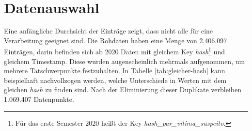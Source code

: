 \documentclass[12pt]{report}
\begin{document}
	\section{Datenauswahl}
	Eine anfängliche Durchsicht der Einträge zeigt, dass nicht alle für eine Verarbeitung geeignet sind. Die Rohdaten haben eine Menge von 2.406.097 Einträgen, darin befinden sich ab 2020 Daten mit gleichem Key \textit{hash}\footnote{Für das erste Semester 2020 heißt der Key \textit{hash\_par\_vitima\_suspeito}.} und gleichem Timestamp. Diese wurden augenscheinlich mehrmals aufgenommen, um mehrere Tatschwerpunkte festzuhalten. In Tabelle \ref{tab:gleicher-hash} kann beispielhaft nachvollzogen werden, welche Unterschiede in Werten mit dem gleichen \textit{hash} zu finden sind. 
	Nach der Eliminierung dieser Duplikate verbleiben 1.069.407 Datenpunkte.\\	
\end{document}
